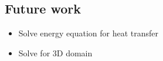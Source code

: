 \documentclass[12pt,a4paper,fleqn]{article}
\begin{document}
\subsection{Future work}
\begin{itemize}
\item Solve energy equation for heat transfer
\item Solve for 3D domain
\end{itemize}
\end{document}
